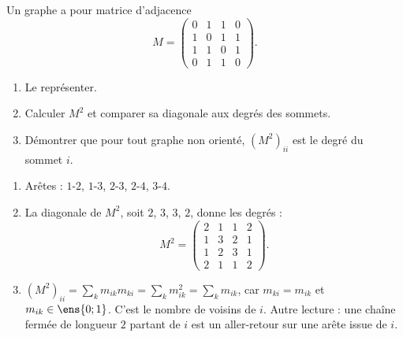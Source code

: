 \begin{exercise}
Un graphe a pour matrice d'adjacence \[M=\begin{pmatrix}0&1&1&0\\1&0&1&1\\1&1&0&1\\0&1&1&0\end{pmatrix}.\]
\begin{enumerate}
\item Le représenter.
\item Calculer $M^2$ et comparer sa diagonale aux degrés des sommets.
\item Démontrer que pour tout graphe non orienté, $\left(M^2\right)_{ii}$ est le degré du sommet $i$.
\end{enumerate}
\end{exercise}
\begin{solution}
\begin{enumerate}
\item Arêtes : $1$-$2$, $1$-$3$, $2$-$3$, $2$-$4$, $3$-$4$.
\item La diagonale de $M^2$, soit $2$, $3$, $3$, $2$, donne les degrés : \[M^2=\begin{pmatrix}2&1&1&2\\1&3&2&1\\1&2&3&1\\2&1&1&2\end{pmatrix}.\]
\item $\left(M^2\right)_{ii}=\sum_km_{ik}m_{ki}=\sum_km_{ik}^2=\sum_km_{ik}$, car $m_{ki}=m_{ik}$ et $m_{ik}\in\ens{0;1}$. C'est le nombre de voisins de $i$. Autre lecture : une chaîne fermée de longueur $2$ partant de $i$ est un aller-retour sur une arête issue de $i$.
\end{enumerate}
\end{solution}

